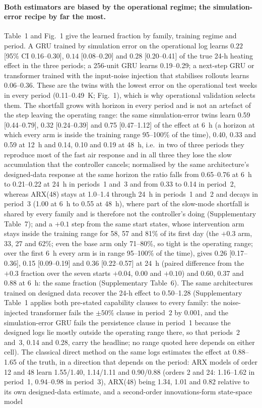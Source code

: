 \documentclass[11pt]{article}
\begin{document}
\paragraph{Both estimators are biased by the operational regime; the simulation-error recipe by far the most.} Table~1 and Fig.~1 give the learned fraction by family, training regime and period. A GRU trained by simulation error on the operational log learns $0.22$ [95\% CI 0.16--0.30], $0.14$ [0.08--0.20] and $0.28$ [0.20--0.41] of the true 24-h heating effect in the three periods; a 256-unit GRU learns 0.19--0.29; a next-step GRU or transformer trained with the input-noise injection that stabilises rollouts learns 0.06--0.36. These are the twins with the lowest error on the operational test weeks in every period (0.11--0.49~K; Fig.~1), which is why operational validation selects them. The shortfall grows with horizon in every period and is not an artefact of the step leaving the operating range: the same simulation-error twins learn 0.59 [0.44--0.79], 0.32 [0.24--0.39] and 0.75 [0.47--1.12] of the effect at 6~h (a horizon at which every arm is inside the training range 95--100\% of the time), 0.40, 0.33 and 0.59 at 12~h and 0.14, 0.10 and 0.19 at 48~h, i.e.\ in two of three periods they reproduce most of the fast air response and in all three they lose the slow accumulation that the controller cancels; normalised by the same architecture's designed-data response at the same horizon the ratio falls from 0.65--0.76 at 6~h to 0.21--0.22 at 24~h in periods~1 and~3 and from 0.33 to 0.14 in period~2, whereas ARX(48) stays at 1.0--1.4 through 24~h in periods~1 and~2 and decays in period~3 (1.00 at 6~h to 0.55 at 48~h), where part of the slow-mode shortfall is shared by every family and is therefore not the controller's doing (Supplementary Table~7); and a $+0.1$ step from the same start states, whose intervention arm stays inside the training range for 58, 57 and 81\% of its first day (the $+0.3$ arm, 33, 27 and 62\%; even the base arm only 71--80\%, so tight is the operating range; over the first 6~h every arm is in range 95--100\% of the time), gives 0.26 [0.17--0.36], 0.15 [0.09--0.19] and 0.36 [0.22--0.57] at 24~h (paired difference from the $+0.3$ fraction over the seven starts $+0.04$, $0.00$ and $+0.10$) and 0.60, 0.37 and 0.88 at 6~h: the same fraction (Supplementary Table~6). The same architectures trained on designed data recover the 24-h effect to 0.50--1.28 (Supplementary Table~1 applies both pre-stated capability clauses to every family: the noise-injected transformer fails the $\pm50\%$ clause in period~2 by 0.001, and the simulation-error GRU fails the persistence clause in period~1 because the designed logs lie mostly outside the operating range there, so that periods~2 and~3, 0.14 and 0.28, carry the headline; no range quoted here depends on either cell). The classical direct method on the same logs estimates the effect at 0.88--1.65 of the truth, in a direction that depends on the period: ARX models of order 12 and 48 learn 1.55/1.40, 1.14/1.11 and 0.90/0.88 (orders 2 and 24: 1.16--1.62 in period~1, 0.94--0.98 in period~3), ARX(48) being 1.34, 1.01 and 0.82 relative to its own designed-data estimate, and a second-order innovations-form state-space model 
\end{document}
